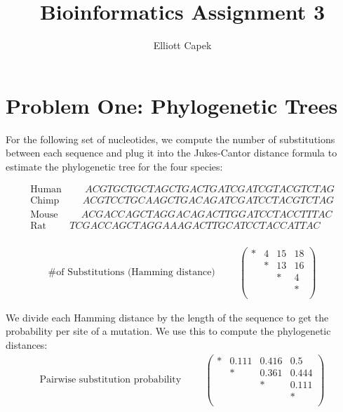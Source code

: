 \documentclass[10pt]{article} %
\title{Bioinformatics Assignment 3}
\author{Elliott Capek}
\begin{document}
\maketitle{}

\section{Problem One: Phylogenetic Trees}
For the following set of nucleotides, we compute the number of substitutions between
each sequence and plug it into the Jukes-Cantor distance formula to estimate the
phylogenetic tree for the four species:

\begin{align*}
  \mbox{Human} \hspace{1cm}ACGTGCTGCTAGCTGACTGATCGATCGTACGTCTAG\\
  \mbox{Chimp} \hspace{1cm}ACGTCCTGCAAGCTGACAGATCGATCCTACGTCTAG\\
  \mbox{Mouse} \hspace{1cm}ACGACCAGCTAGGACAGACTTGGATCCTACCTTTAC\\
  \mbox{Rat}   \hspace{1cm}TCGACCAGCTAGGAAAGACTTGCATCCTACCATTAC\\
\end{align*}

\begin{align*}
  \mbox{\# of Substitutions (Hamming distance)} \hspace{1cm}
  \begin{pmatrix}
    * & 4 & 15 & 18\\
    & * & 13 & 16\\
    & & * & 4\\
    & & & *\\
  \end{pmatrix}
\end{align*}

We divide each Hamming distance by the length of the sequence to get the probability per site
of a mutation. We use this to compute the phylogenetic distances:\\

\begin{align*}
  \mbox{Pairwise substitution probability} \hspace{1cm}
  \begin{pmatrix}
    * & 0.111 & 0.416 & 0.5\\
    & * & 0.361 & 0.444\\
    & & * & 0.111\\
    & & & *\\
  \end{pmatrix}
\end{align*}
\end{document}
